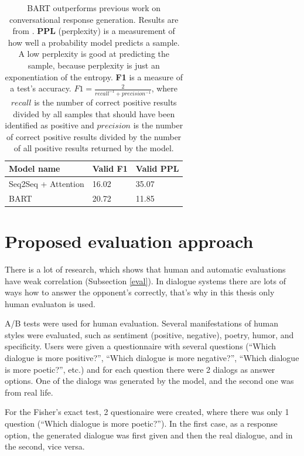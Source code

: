 \begin{table}[ht]
\centering
 \begin{tabular}{|p{5cm}|p{3cm}|p{3cm}|} 
 \hline
 \textbf{Model name} & \textbf{Valid F1} & \textbf{Valid PPL} \\
 \hline
 Seq2Seq + Attention & 16.02 & 35.07 \\
 \hline
 BART & 20.72 & 11.85 \\
 \hline
 \end{tabular}
 \caption{BART outperforms previous work on conversational response generation. Results are from \cite{lewis2019bart}. \textbf{PPL} (perplexity) is a measurement of how well a probability model predicts a sample. A low perplexity is good at predicting the sample, because perplexity is just an exponentiation of the entropy. \textbf{F1} is a measure of a test's accuracy. $F1 = \frac{2}{recall^{-1} + precision^{-1}}$, where $recall$ is the number of correct positive results divided by all samples that should have been identified as positive and $precision$ is the number of correct positive results divided by the number of all positive results returned by the model.}
\label{tab:bart_statistic}
\end{table}

\section{Proposed evaluation approach}
There is a lot of research, which shows that human and automatic evaluations have weak correlation (Subsection \ref{eval}). In dialogue systems there are lots of ways how to answer the opponent's correctly, that's why in this thesis only human evaluaton is used. 

A/B tests were used for human evaluation. Several manifestations of human styles were evaluated, such as sentiment (positive, negative), poetry, humor, and specificity. Users were given a questionnaire with several questions (``Which dialogue is more positive?'', ``Which dialogue is more negative?'', ``Which dialogue is more poetic?'', etc.) and for each question there were 2 dialogs as answer options. One of the dialogs was generated by the model, and the second one was from real life.

For the Fisher's exact test, 2 questionaire were created, where there was only 1 question (``Which dialogue is more poetic?''). In the first case, as a response option, the generated dialogue was first given and then the real dialogue, and in the second, vice versa.


